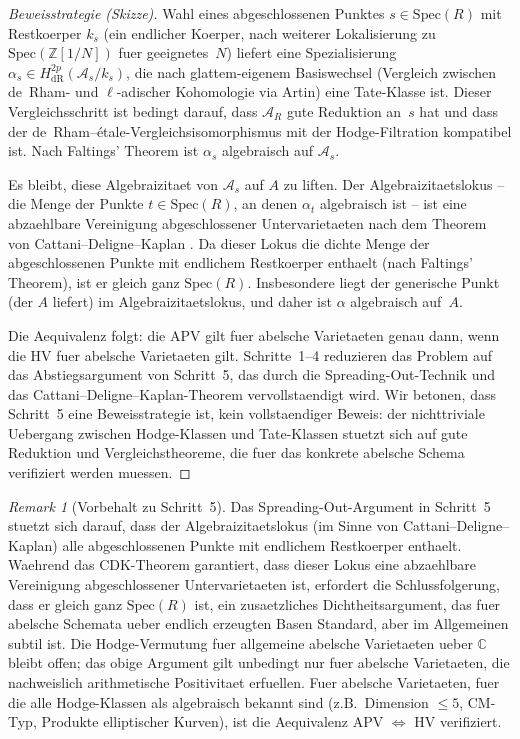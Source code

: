 \documentclass[aps,prd,twocolumn,superscriptaddress,nofootinbib]{revtex4-2}
\theoremstyle{definition}
\theoremstyle{remark}
\newtheorem{remark}[theorem]{Remark}
\begin{document}
\begin{proof}[Beweisstrategie (Skizze)]
Wahl eines abgeschlossenen Punktes $s \in \mathrm{Spec}(R)$ mit Restkoerper $k_s$ (ein endlicher Koerper, nach weiterer Lokalisierung zu $\mathrm{Spec}(\mathbb{Z}[1/N])$ fuer geeignetes~$N$) liefert eine Spezialisierung $\alpha_s \in H^{2p}_{\mathrm{dR}}(\mathcal{A}_s/k_s)$, die nach glattem-eigenem Basiswechsel (Vergleich zwischen de~Rham- und $\ell$-adischer Kohomologie via Artin) eine Tate-Klasse ist. Dieser Vergleichsschritt ist bedingt darauf, dass $\mathcal{A}_R$ gute Reduktion an~$s$ hat und dass der de~Rham--\'etale-Vergleichsisomorphismus mit der Hodge-Filtration kompatibel ist. Nach Faltings' Theorem \cite{Faltings1983} ist $\alpha_s$ algebraisch auf $\mathcal{A}_s$.

Es bleibt, diese Algebraizitaet von $\mathcal{A}_s$ auf $A$ zu liften. Der Algebraizitaetslokus -- die Menge der Punkte $t \in \mathrm{Spec}(R)$, an denen $\alpha_t$ algebraisch ist -- ist eine abzaehlbare Vereinigung abgeschlossener Untervarietaeten nach dem Theorem von Cattani--Deligne--Kaplan \cite{CattaniDeligneKaplan1995}. Da dieser Lokus die dichte Menge der abgeschlossenen Punkte mit endlichem Restkoerper enthaelt (nach Faltings' Theorem), ist er gleich ganz $\mathrm{Spec}(R)$. Insbesondere liegt der generische Punkt (der $A$ liefert) im Algebraizitaetslokus, und daher ist $\alpha$ algebraisch auf~$A$.

Die Aequivalenz folgt: die APV gilt fuer abelsche Varietaeten genau dann, wenn die HV fuer abelsche Varietaeten gilt. Schritte~1--4 reduzieren das Problem auf das Abstiegsargument von Schritt~5, das durch die Spreading-Out-Technik und das Cattani--Deligne--Kaplan-Theorem vervollstaendigt wird. Wir betonen, dass Schritt~5 eine Beweisstrategie ist, kein vollstaendiger Beweis: der nichttriviale Uebergang zwischen Hodge-Klassen und Tate-Klassen stuetzt sich auf gute Reduktion und Vergleichstheoreme, die fuer das konkrete abelsche Schema verifiziert werden muessen.
\end{proof}

\begin{remark}[Vorbehalt zu Schritt~5]
Das Spreading-Out-Argument in Schritt~5 stuetzt sich darauf, dass der Algebraizitaetslokus (im Sinne von Cattani--Deligne--Kaplan) alle abgeschlossenen Punkte mit endlichem Restkoerper enthaelt. Waehrend das CDK-Theorem garantiert, dass dieser Lokus eine abzaehlbare Vereinigung abgeschlossener Untervarietaeten ist, erfordert die Schlussfolgerung, dass er gleich ganz $\mathrm{Spec}(R)$ ist, ein zusaetzliches Dichtheitsargument, das fuer abelsche Schemata ueber endlich erzeugten Basen Standard, aber im Allgemeinen subtil ist. Die Hodge-Vermutung fuer allgemeine abelsche Varietaeten ueber $\mathbb{C}$ bleibt offen; das obige Argument gilt unbedingt nur fuer abelsche Varietaeten, die nachweislich arithmetische Positivitaet erfuellen. Fuer abelsche Varietaeten, fuer die alle Hodge-Klassen als algebraisch bekannt sind (z.B.\ Dimension $\leq 5$, CM-Typ, Produkte elliptischer Kurven), ist die Aequivalenz APV $\Leftrightarrow$ HV verifiziert.
\end{remark}
\end{document}
